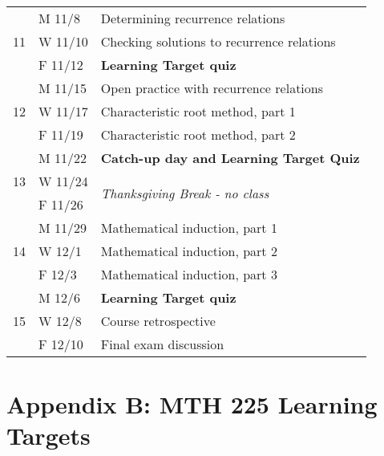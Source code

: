 \documentclass[]{article}
\begin{document}
\begin{table}[H]
\begin{tabular}{|c|l|l|}
\multirow{3}{*}{11} & M 11/8  & Determining recurrence relations                                     \\ \cline{2-3} 
                    & W 11/10 & Checking solutions to recurrence relations                           \\ \cline{2-3} 
                    & F 11/12 & \textbf{Learning Target quiz}                                        \\ \hline
\multirow{3}{*}{12} & M 11/15 & Open practice with recurrence relations                              \\ \cline{2-3} 
                    & W 11/17 & Characteristic root method, part 1                                   \\ \cline{2-3} 
                    & F 11/19 & Characteristic root method, part 2                                   \\ \hline
\multirow{3}{*}{13} & M 11/22 & \textbf{Catch-up day and Learning Target Quiz}                       \\ \cline{2-3} 
                    & W 11/24 & \multirow{2}{*}{\textit{Thanksgiving Break - no class}}              \\ \cline{2-2}
                    & F 11/26 &                                                                      \\ \hline
\multirow{3}{*}{14} & M 11/29 & Mathematical induction, part 1                                       \\ \cline{2-3} 
                    & W 12/1  & Mathematical induction, part 2                                       \\ \cline{2-3} 
                    & F 12/3  & Mathematical induction, part 3                                       \\ \hline
\multirow{3}{*}{15} & M 12/6  & \textbf{Learning Target quiz}                                        \\ \cline{2-3} 
                    & W 12/8  & Course retrospective                                                 \\ \cline{2-3} 
                    & F 12/10 & Final exam discussion                                                \\ \hline
\end{tabular}
\end{table}


\vfill \eject

\section{Appendix B: MTH 225 Learning Targets}
\label{sec:learning-targets}
\end{document}
